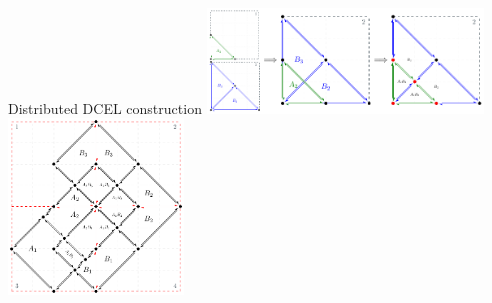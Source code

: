 \documentclass{beamer}
\begin{document}
    \begin{frame}{Distributed DCEL construction}
        \centering
        \includegraphics[width=0.55\textwidth]{figures/overlay_partition} \\
        \vspace{0.5cm}
        \includegraphics[width=0.35\textwidth]{figures/distributed_dcel}
    \end{frame}
\end{document}
